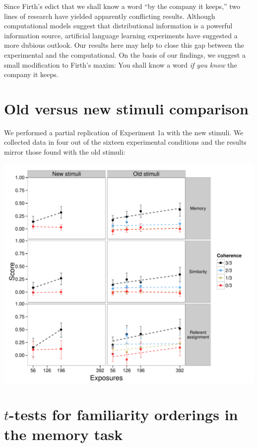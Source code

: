 \documentclass[man,floatsintext]{apa6}
\begin{document}
Since Firth's edict that we shall know a word ``by the company it keeps,'' two lines of research have yielded apparently conflicting results. Although computational models suggest that distributional information is a powerful information source, artificial language learning experiments have suggested a more dubious outlook. Our results here may help to close this gap between the experimental and the computational. On the basis of our findings, we suggest a small modification to Firth's maxim: You shall know a word \emph{if you know} the company it keeps.

\newpage



\appendix
\section{Old versus new stimuli comparison}
\label{old-vs-new}

We performed a partial replication of Experiment 1a with the new stimuli. We collected data in four out of the sixteen experimental conditions and the results mirror those found with the old stimuli:

\begin{center}
\includegraphics[width=0.9\linewidth]{stim-comparison} \\

\end{center}



\appendix
\section{$t$-tests for familiarity orderings in the memory task}
\end{document}

